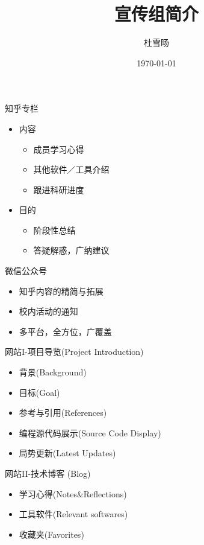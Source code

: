 \documentclass{beamer}
\begin{document}
\begin{CJK*}{UTF8}{song}


\title{宣传组简介}
\author{杜雪旸}
\date{\today}
\titlepage

\begin{frame}{知乎专栏}
\begin{itemize}
  \item 内容
  \begin{itemize}
           \item 成员学习心得
           \item 其他软件／工具介绍
           \item 跟进科研进度
         \end{itemize}
  \item 目的
  \begin{itemize}
    \item 阶段性总结
    \item 答疑解惑，广纳建议
  \end{itemize}
\end{itemize}
\end{frame}

\begin{frame}{微信公众号}
\begin{itemize}
  \item 知乎内容的精简与拓展
  \item 校内活动的通知
  \item 多平台，全方位，广覆盖
\end{itemize}
\end{frame}

\begin{frame}{网站I-项目导览(Project Introduction)}
\begin{itemize}
  \item 背景(Background)
  \item 目标(Goal)
  \item 参考与引用(References)
  \item 编程源代码展示(Source Code Display)
  \item 局势更新(Latest Updates)
\end{itemize}
\end{frame}

\begin{frame}{网站II-技术博客 (Blog)}
\begin{itemize}
  \item 学习心得(Notes\&Reflections)
  \item 工具软件(Relevant softwares)
  \item 收藏夹(Favorites)
\end{itemize}
\end{frame}


\end{CJK*}
\end{document}

